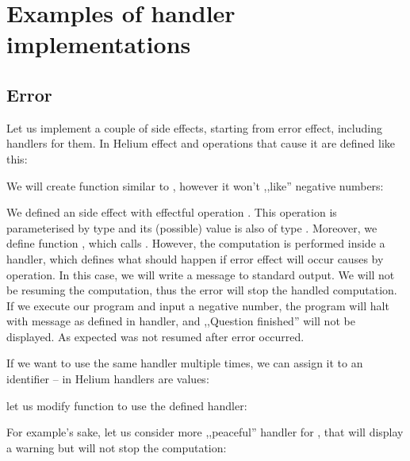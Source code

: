 \section{Examples of handler implementations}

\subsection{Error}

Let us implement a couple of side effects, starting from error effect, including handlers for them. In Helium effect and operations that cause it are defined like this:



We will create function similar to , however it won't ,,like'' negative numbers:



We defined an  side effect with effectful operation . This operation is parameterised by type  and its (possible) value is also of type . Moreover, we define function , which calls . However, the computation is performed inside a handler, which defines what should happen if error effect will occur causes by  operation. In this case, we will write a message to standard output. We will not be resuming the computation, thus the error will stop the handled computation. If we execute our program and input a negative number, the program will halt with message as defined in handler, and ,,Question finished'' will not be displayed. As expected  was not resumed after error occurred.

If we want to use the same handler multiple times, we can assign it to an identifier -- in Helium handlers are values:



let us modify function  to use the defined handler:



For example's sake, let us consider more ,,peaceful'' handler for , that will display a warning but will not stop the computation:



